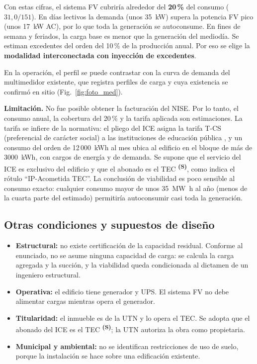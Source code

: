 \documentclass[12pt]{article}
\newcommand{\supuesto}{\textsuperscript{\textcolor{orange!80!black}{\textbf{(S)}}}}
\begin{document}
Con estas cifras, el sistema FV cubriría alrededor del \textbf{20\,\%} del consumo ($31{,}0/151$). En días lectivos la demanda (unos \SI{35}{\kilo\watt}) supera la potencia FV pico (unos \SI{17}{\kilo\watt} AC), por lo que toda la generación se autoconsume. En fines de semana y feriados, la carga base es menor que la generación del mediodía. Se estiman excedentes del orden del 10\,\% de la producción anual. Por eso se elige la \textbf{modalidad interconectada con inyección de excedentes}.

En la operación, el perfil se puede contrastar con la curva de demanda del multimedidor existente, que registra perfiles de carga y cuya existencia se confirmó en sitio (Fig.~\ref{fig:foto_med}).

\textbf{Limitación.} No fue posible obtener la facturación del NISE. Por lo tanto, el consumo anual, la cobertura del 20\,\% y la tarifa aplicada son estimaciones. La tarifa se infiere de la normativa: el pliego del ICE asigna la tarifa T-CS (preferencial de carácter social) a las instituciones de educación pública \cite{icePliego}, y un consumo del orden de 12\,000~kWh al mes ubica al edificio en el bloque de más de 3000~kWh, con cargos de energía y de demanda. Se supone que el servicio del ICE es exclusivo del edificio y que el abonado es el TEC \supuesto{}, como indica el rótulo ``IP-Acometida TEC''. La conclusión de viabilidad es poco sensible al consumo exacto: cualquier consumo mayor de unos \SI{35}{\mega\watt\hour} al año (menos de la cuarta parte del estimado) permitiría autoconsumir casi toda la generación.

\subsection{Otras condiciones y supuestos de diseño}
\label{sec:otras}
\begin{itemize}
\item \textbf{Estructural:} no existe certificación de la capacidad residual. Conforme al enunciado, no se asume ninguna capacidad de carga: se calcula la carga agregada y la succión, y la viabilidad queda condicionada al dictamen de un ingeniero estructural.
\item \textbf{Operativa:} el edificio tiene generador y UPS. El sistema FV no debe alimentar cargas mientras opera el generador.
\item \textbf{Titularidad:} el inmueble es de la UTN y lo opera el TEC. Se adopta que el abonado del ICE es el TEC \supuesto{}; la UTN autoriza la obra como propietaria.
\item \textbf{Municipal y ambiental:} no se identifican restricciones de uso de suelo, porque la instalación se hace sobre una edificación existente.
\end{itemize}
\end{document}
